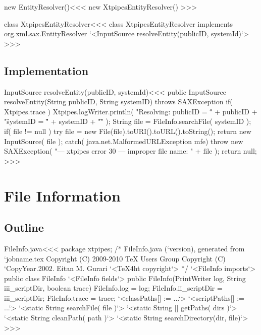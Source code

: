 \documentclass{article}
\begin{document}
\<new EntityResolver()\><<<
new XtpipesEntityResolver()
>>>

\<class XtpipesEntityResolver\><<<
class XtpipesEntityResolver implements  org.xml.sax.EntityResolver {
   `<InputSource resolveEntity(publicID, systemId)`>
}
>>>


\subsection{Implementation}



\<InputSource resolveEntity(publicID, systemId)\><<<
public InputSource resolveEntity(String publicID, String systemID)
                                                    throws SAXException {
   if( Xtpipes.trace ){
      Xtpipes.logWriter.println( "Resolving: publicID = \" " + publicID
                + "\"  systemID = \"" + systemID + "\"" );
   }
   String file = FileInfo.searchFile( systemID );
   if( file != null ){
     try{
        file = new File(file).toURI().toURL().toString();
        return new InputSource( file );
     } catch( java.net.MalformedURLException mfe){
        throw new SAXException(
          "--- xtpipes error 30 --- improper file name: " + file  );
   } }
   return null;
}
>>>



\section{File Information}


\subsection{Outline}




% 

\<FileInfo.java\><<<
package xtpipes;
/* FileInfo.java (`version), generated from `jobname.tex
   Copyright (C) 2009-2010 TeX Users Group
   Copyright (C) `CopyYear.2002. Eitan M. Gurari
`<TeX4ht copyright`> */
`<FileInfo imports`>
public class FileInfo{
     `<FileInfo fields`>
   public FileInfo(PrintWriter log, String iii_scriptDir, boolean trace) {
      FileInfo.log = log;
      FileInfo.ii_scriptDir = iii_scriptDir;
      FileInfo.trace = trace;
      `<classPaths[] := ...`>
      `<scriptPaths[] := ...`>
   }
   `<static String searchFile( file )`>
   `<static String [] getPaths( dirs )`>
   `<static String cleanPath( path )`>
   `<static String searchDirectory(dir, file)`>
}
>>>
\end{document}

